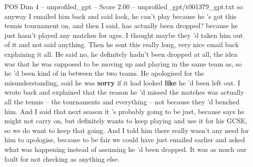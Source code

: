 \begin{textsample}{POS Dim 4 – unprofiled\_gpt – Score 2.00 – unprofiled\_gpt/t001379\_gpt.txt}  \label{ex:f4_pos_029}
so anyway I emailed him back and said look, he can't play because he ’s got this tennis tournament on, and then I said, has actually been dropped? because he just hasn't played any matches for ages.
I thought maybe they ’d taken him out of it and not said anything.
Then he sent this really long, very nice email back explaining it all.
He said no, he definitely hadn't been dropped at all, the idea was that he was supposed to be moving up and playing in the same team as, so he ’d been kind of in between the two teams.
He apologised for the misunderstanding, said he was \textbf{sorry} if it had looked \textbf{like} he ’d been left out.
I wrote back and explained that the reason he ’d missed the matches was actually all the tennis – the tournaments and everything – not because they ’d benched him.
And I said that next season it ’s probably going to be just, because says he might not carry on, but definitely wants to keep playing and use it for his GCSE, so we do want to keep that going.
And I told him there really wasn't any need for him to apologise, because to be fair we could have just emailed earlier and asked what was happening instead of assuming he ’d been dropped.
It was as much our fault for not checking as anything else.

\end{textsample}
